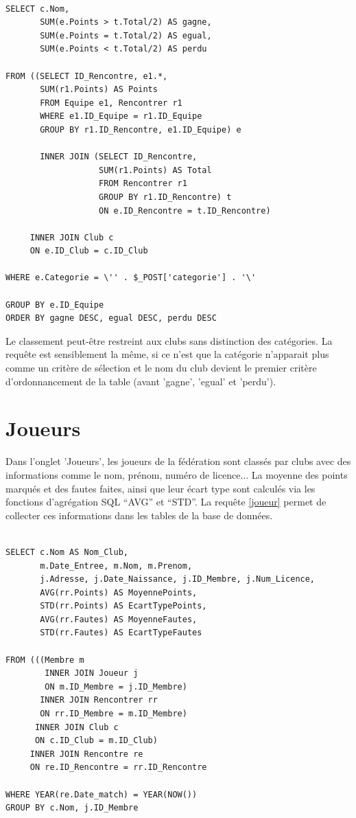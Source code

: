 \documentclass[a4paper»,8pt,french,fleqn]{report}
\begin{document}
\begin{lstlisting}

SELECT c.Nom,
       SUM(e.Points > t.Total/2) AS gagne,
       SUM(e.Points = t.Total/2) AS egual,
       SUM(e.Points < t.Total/2) AS perdu
			
FROM ((SELECT ID_Rencontre, e1.*,
       SUM(r1.Points) AS Points
       FROM Equipe e1, Rencontrer r1
       WHERE e1.ID_Equipe = r1.ID_Equipe
       GROUP BY r1.ID_Rencontre, e1.ID_Equipe) e 
                
       INNER JOIN (SELECT ID_Rencontre,
                   SUM(r1.Points) AS Total
                   FROM Rencontrer r1
                   GROUP BY r1.ID_Rencontre) t
                   ON e.ID_Rencontre = t.ID_Rencontre)
 
     INNER JOIN Club c
     ON e.ID_Club = c.ID_Club
			  
WHERE e.Categorie = \'' . $_POST['categorie'] . '\'

GROUP BY e.ID_Equipe
ORDER BY gagne DESC, egual DESC, perdu DESC

\end{lstlisting}

Le classement peut-être restreint aux clubs sans distinction des catégories. La requête est sensiblement la même, si ce n'est que la catégorie n'apparait plus comme un critère de sélection et le nom du club devient le premier critère d'ordonnancement de la table (avant 'gagne', 'egual' et 'perdu'). 


\section{Joueurs}
Dans l'onglet 'Joueurs', les joueurs de la fédération sont classés par clubs avec des informations comme le nom, prénom, numéro de licence... La moyenne des points marqués et des fautes faites, ainsi que leur écart type sont calculés via les fonctions d'agrégation SQL ``AVG'' et ``STD''. La requête \ref{joueur} permet de collecter ces informations dans les tables de la base de données.

\begin{lstlisting}

SELECT c.Nom AS Nom_Club, 
       m.Date_Entree, m.Nom, m.Prenom, 
       j.Adresse, j.Date_Naissance, j.ID_Membre, j.Num_Licence,
       AVG(rr.Points) AS MoyennePoints,
       STD(rr.Points) AS EcartTypePoints,
       AVG(rr.Fautes) AS MoyenneFautes,
       STD(rr.Fautes) AS EcartTypeFautes

FROM (((Membre m 
        INNER JOIN Joueur j
        ON m.ID_Membre = j.ID_Membre) 
       INNER JOIN Rencontrer rr
       ON rr.ID_Membre = m.ID_Membre)
      INNER JOIN Club c
      ON c.ID_Club = m.ID_Club)
     INNER JOIN Rencontre re
     ON re.ID_Rencontre = rr.ID_Rencontre

WHERE YEAR(re.Date_match) = YEAR(NOW())
GROUP BY c.Nom, j.ID_Membre

\end{lstlisting}
\end{document}
